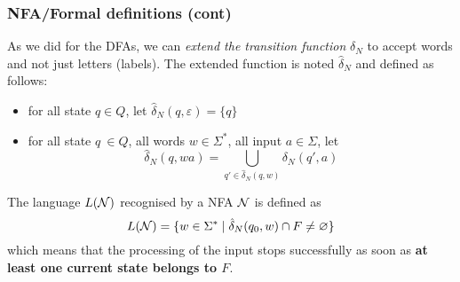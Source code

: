 % 
\begin{frame}
\frametitle{NFA/Formal definitions (cont)}

As we did for the DFAs, we can \emph{extend the transition function}
\(\delta_N\) to accept words and not just letters (labels). The extended
function is noted \(\hat{\delta}_N\) and defined as follows:
\begin{itemize}

  \item for all state \(q \in Q\), let \(\hat{\delta}_N (q,
  \varepsilon) = \{q\}\)

  \item for all state \(q\ \in Q\), all words \(w \in \Sigma^{*}\),
  all input \(a \in \Sigma\), let \[\hat{\delta}_N (q, wa) =
  \bigcup_{q' \in \hat{\delta}_N (q, w)}{\delta_N  (q', a)}\]
\end{itemize}
The language \(L({\cal N})\) recognised by a NFA \(\cal N\) is
defined as
\[
L({\cal N}) = \{w \in \Sigma^{*} \; \lvert \; \hat{\delta}_N (q_0, w)
\cap F \neq \varnothing\}
\]
which means that the processing of the input stops successfully as
soon as \textbf{at least one current state belongs to \(F\)}.

\end{frame}

